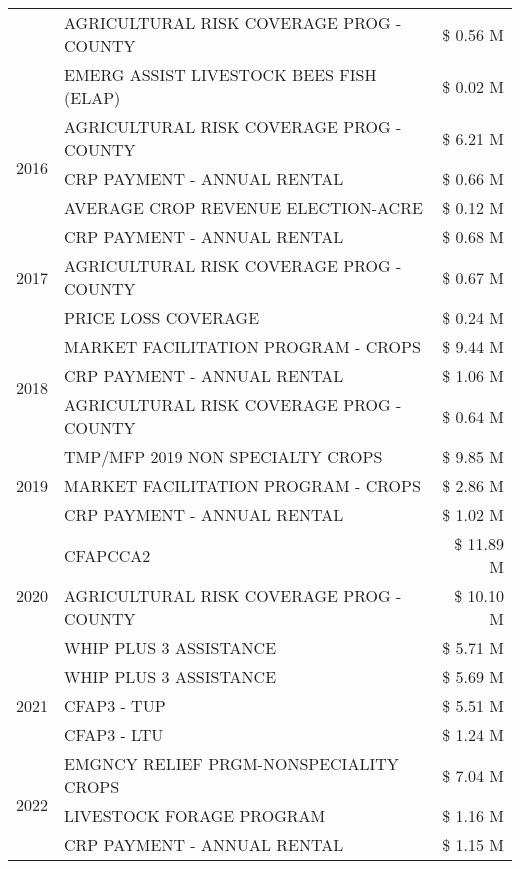 \begin{tabular}{llr}
 & AGRICULTURAL RISK COVERAGE PROG - COUNTY & \$ 0.56 M \\
 & EMERG ASSIST LIVESTOCK BEES FISH (ELAP) & \$ 0.02 M \\
\cline{1-3}
\multirow[t]{3}{*}{2016} & AGRICULTURAL RISK COVERAGE PROG - COUNTY & \$ 6.21 M \\
 & CRP PAYMENT - ANNUAL RENTAL & \$ 0.66 M \\
 & AVERAGE CROP REVENUE ELECTION-ACRE & \$ 0.12 M \\
\cline{1-3}
\multirow[t]{3}{*}{2017} & CRP PAYMENT - ANNUAL RENTAL & \$ 0.68 M \\
 & AGRICULTURAL RISK COVERAGE PROG - COUNTY & \$ 0.67 M \\
 & PRICE LOSS COVERAGE & \$ 0.24 M \\
\cline{1-3}
\multirow[t]{3}{*}{2018} & MARKET FACILITATION PROGRAM - CROPS & \$ 9.44 M \\
 & CRP PAYMENT - ANNUAL RENTAL & \$ 1.06 M \\
 & AGRICULTURAL RISK COVERAGE PROG - COUNTY & \$ 0.64 M \\
\cline{1-3}
\multirow[t]{3}{*}{2019} & TMP/MFP 2019 NON SPECIALTY CROPS & \$ 9.85 M \\
 & MARKET FACILITATION PROGRAM - CROPS & \$ 2.86 M \\
 & CRP PAYMENT - ANNUAL RENTAL & \$ 1.02 M \\
\cline{1-3}
\multirow[t]{3}{*}{2020} & CFAPCCA2 & \$ 11.89 M \\
 & AGRICULTURAL RISK COVERAGE PROG - COUNTY & \$ 10.10 M \\
 & WHIP PLUS 3 ASSISTANCE & \$ 5.71 M \\
\cline{1-3}
\multirow[t]{3}{*}{2021} & WHIP PLUS 3 ASSISTANCE & \$ 5.69 M \\
 & CFAP3 - TUP & \$ 5.51 M \\
 & CFAP3 - LTU & \$ 1.24 M \\
\cline{1-3}
\multirow[t]{3}{*}{2022} & EMGNCY RELIEF PRGM-NONSPECIALITY CROPS & \$ 7.04 M \\
 & LIVESTOCK FORAGE PROGRAM & \$ 1.16 M \\
 & CRP PAYMENT - ANNUAL RENTAL & \$ 1.15 M \\
\cline{1-3}
\bottomrule
\end{tabular}
